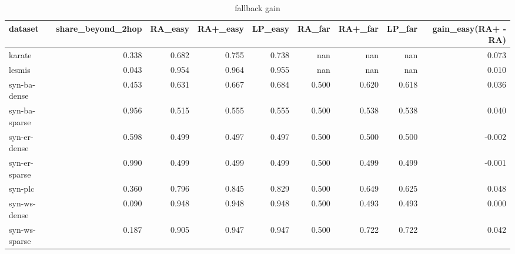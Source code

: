 \begin{table}[t]
\centering
\caption{fallback gain}
\label{tab:fallback_gain}
\begin{tabular}{lrrrrrrrr}
\hline
dataset & share\_beyond\_2hop & RA\_easy & RA+\_easy & LP\_easy & RA\_far & RA+\_far & LP\_far & gain\_easy(RA+ - RA) \\
\hline
karate & 0.338 & 0.682 & 0.755 & 0.738 & nan & nan & nan & 0.073 \\
lesmis & 0.043 & 0.954 & 0.964 & 0.955 & nan & nan & nan & 0.010 \\
syn-ba-dense & 0.453 & 0.631 & 0.667 & 0.684 & 0.500 & 0.620 & 0.618 & 0.036 \\
syn-ba-sparse & 0.956 & 0.515 & 0.555 & 0.555 & 0.500 & 0.538 & 0.538 & 0.040 \\
syn-er-dense & 0.598 & 0.499 & 0.497 & 0.497 & 0.500 & 0.500 & 0.500 & -0.002 \\
syn-er-sparse & 0.990 & 0.499 & 0.499 & 0.499 & 0.500 & 0.499 & 0.499 & -0.001 \\
syn-plc & 0.360 & 0.796 & 0.845 & 0.829 & 0.500 & 0.649 & 0.625 & 0.048 \\
syn-ws-dense & 0.090 & 0.948 & 0.948 & 0.948 & 0.500 & 0.493 & 0.493 & 0.000 \\
syn-ws-sparse & 0.187 & 0.905 & 0.947 & 0.947 & 0.500 & 0.722 & 0.722 & 0.042 \\
\hline
\end{tabular}
\end{table}